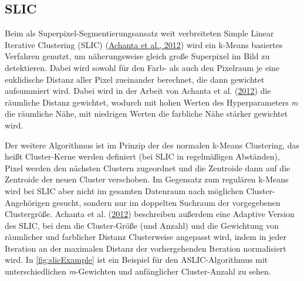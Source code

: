 \documentclass[
  12pt,
]{book}
\begin{document}
\hypertarget{slic}{%
\subsection{SLIC}\label{slic}}

Beim als Superpixel-Segmentierungsansatz weit verbreiteten Simple Linear Iterative Clustering (SLIC) (\protect\hyperlink{ref-achantaSLICSuperpixelsCompared2012}{Achanta et al., 2012}) wird ein k-Means basiertes Verfahren genutzt, um näherungsweise gleich große Superpixel im Bild zu detektieren.
Dabei wird sowohl für den Farb- als auch den Pixelraum je eine euklidische Distanz aller Pixel zueinander berechnet, die dann gewichtet aufsummiert wird. Dabei wird in der Arbeit von Achanta et al. (\protect\hyperlink{ref-achantaSLICSuperpixelsCompared2012}{2012}) die räumliche Distanz gewichtet, wodurch mit hohen Werten des Hyperparameters \emph{m} die räumliche Nähe, mit niedrigen Werten die farbliche Nähe stärker gewichtet wird.

Der weitere Algorithmus ist im Prinzip der des normalen k-Means Clustering, das heißt Cluster-Kerne werden definiert (bei SLIC in regelmäßigen Abständen), Pixel werden den nächsten Clustern zugeordnet und die Zentroide dann auf die Zentroide der neuen Cluster verschoben.
Im Gegensatz zum regulären k-Means wird bei SLIC aber nicht im gesamten Datenraum nach möglichen Cluster-Angehörigen gesucht, sondern nur im doppelten Suchraum der vorgegebenen Clustergröße.
Achanta et al. (\protect\hyperlink{ref-achantaSLICSuperpixelsCompared2012}{2012}) beschreiben außerdem eine Adaptive Version des SLIC, bei dem die Cluster-Größe (und Anzahl) und die Gewichtung von räumlicher und farblicher Distanz Clusterweise angepasst wird, indem in jeder Iteration an der maximalen Distanz der vorhergehenden Iteration normalisiert wird.
In \ref{fig:slicExample} ist ein Beispiel für den ASLIC-Algorithmus mit unterschiedlichen \emph{m}-Gewichten und anfänglicher Cluster-Anzahl zu sehen.
\end{document}
